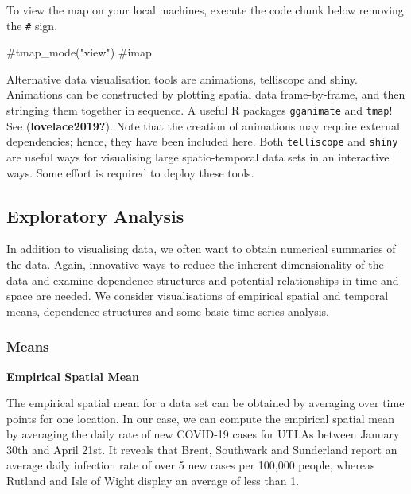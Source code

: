 \documentclass[
  letterpaper,
  krantz2]{style/krantz}
\newenvironment{Shaded}{\begin{snugshade}}{\end{snugshade}}
\newcommand{\CommentTok}[1]{\textcolor[rgb]{0.37,0.37,0.37}{#1}}
\begin{document}
To view the map on your local machines, execute the code chunk below
removing the \texttt{\#} sign.

\begin{Shaded}
\begin{Highlighting}[]
\CommentTok{\#tmap\_mode("view")}
\CommentTok{\#imap}
\end{Highlighting}
\end{Shaded}

Alternative data visualisation tools are animations, telliscope and
shiny. Animations can be constructed by plotting spatial data
frame-by-frame, and then stringing them together in sequence. A useful R
packages \texttt{gganimate} and \texttt{tmap}! See
(\textbf{lovelace2019?}). Note that the creation of animations may
require external dependencies; hence, they have been included here. Both
\texttt{telliscope} and \texttt{shiny} are useful ways for visualising
large spatio-temporal data sets in an interactive ways. Some effort is
required to deploy these tools.

\hypertarget{exploratory-analysis-1}{%
\subsection{Exploratory Analysis}\label{exploratory-analysis-1}}

In addition to visualising data, we often want to obtain numerical
summaries of the data. Again, innovative ways to reduce the inherent
dimensionality of the data and examine dependence structures and
potential relationships in time and space are needed. We consider
visualisations of empirical spatial and temporal means, dependence
structures and some basic time-series analysis.

\hypertarget{means}{%
\subsubsection{Means}\label{means}}

\textbf{Empirical Spatial Mean}

The empirical spatial mean for a data set can be obtained by averaging
over time points for one location. In our case, we can compute the
empirical spatial mean by averaging the daily rate of new COVID-19 cases
for UTLAs between January 30th and April 21st. It reveals that Brent,
Southwark and Sunderland report an average daily infection rate of over
5 new cases per 100,000 people, whereas Rutland and Isle of Wight
display an average of less than 1.
\end{document}
